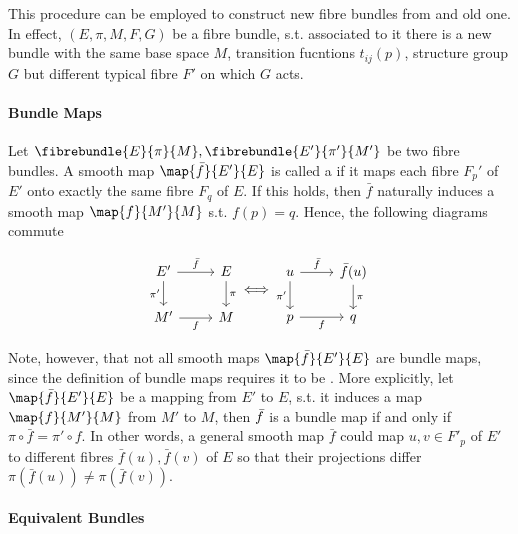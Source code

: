 This procedure can be employed to construct new fibre bundles from and old one. 
In effect, $(E, \pi, M, F, G)$ be a fibre bundle, s.t. associated to it there is a new bundle with the same base space $M$, transition fucntions $t_{ij}(p)$, structure group $G$ but different typical fibre $F'$ on which $G$ acts. \medbreak

\paragraph{Bundle Maps}

Let $\fibrebundle{E}{\pi}{M}, \fibrebundle{E'}{\pi'}{M'}$ be two fibre bundles. 
A smooth map $\map{\bar{f}}{E'}{E}$ is called a  if it maps each fibre $F_p'$ of $E'$ onto exactly the same fibre $F_q$ of $E$.
If this holds, then $\bar{f}$ naturally induces a smooth map $\map{f}{M'}{M}$ s.t. $f(p) = q$. 
Hence, the following diagrams commute

\[
\begin{tikzcd}
	{E'} & E \\
	{M'} & M
	\arrow["{\pi'}"', from=1-1, to=2-1]
	\arrow["f"', from=2-1, to=2-2]
	\arrow["\pi", from=1-2, to=2-2]
	\arrow["{\bar{f}}", from=1-1, to=1-2]
\end{tikzcd} \Longleftrightarrow 
\begin{tikzcd}
    {u} & {\bar{f}(u)} \\
    {p} & {q} 
    \arrow["{\pi'}"', from=1-1, to=2-1]
	\arrow["f"', from=2-1, to=2-2]
	\arrow["\pi", from=1-2, to=2-2]
	\arrow["{\bar{f}}", from=1-1, to=1-2]
\end{tikzcd}
\]

\begin{remark}
\end{remark}

Note, however, that not all smooth maps $\map{\bar{f}}{E'}{E}$ are bundle maps, since the definition of bundle maps requires it to be . 
More explicitly, let $\map{\bar{f}}{E'}{E}$ be a mapping from $E'$ to $E$, s.t. it induces a map $\map{{f}}{M'}{M}$ from $M'$ to $M$, then $\Bar{f}$ is a bundle map if and only if 
$\pi \circ \bar{f} = \pi' \circ f$. 
In other words, a general smooth map $\bar{f}$ could map $u,v \in F'_p$ of $E'$ to different fibres $\bar{f}(u), \bar{f}(v)$ of $E$ so that their projections differ $\pi (\bar{f}(u)) \neq \pi(\bar{f}(v))$. \medbreak

\paragraph{Equivalent Bundles}

